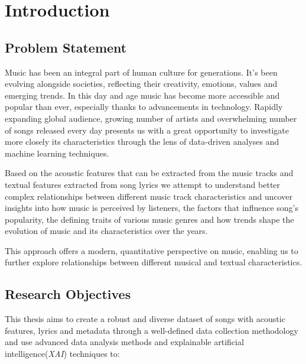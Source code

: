 \chapter{Introduction}
\label{cha:introduction}

\section{Problem Statement}
\label{sec:problemstatement}
Music has been an integral part of human culture for
generations. It's been evolving alongside societies, reflecting their
creativity, emotions, values and emerging trends. In this day and age music has
become more accessible and popular than ever, especially thanks to advancements
in technology. Rapidly expanding global audience, growing number of artists and
overwhelming number of songs released every day presents us with a great
opportunity to investigate more closely its characteristics through the lens of
data-driven analyses and machine learning techniques. 

Based on the acoustic features that can be extracted from the music tracks and
textual features extracted from song lyrics we attempt to understand better
complex relationships between different music track characteristics and uncover
insights into how music is perceived by listeners, the factors that influence
song's popularity, the defining traits of various music genres and how trends
shape the evolution of music and its characteristics over the years. 

This approach offers a modern, quantitative perspective on music, enabling us
to further explore relationships between different musical and textual
characteristics.






\section{Research Objectives}
\label{sec:researchobjectives}
This thesis aims to create a robust and diverse dataset of songs with acoustic
features, lyrics and metadata through a well-defined data collection
methodology and use advanced data analysis methods and explainable artificial
intelligence(\textit{XAI}) techniques to:

